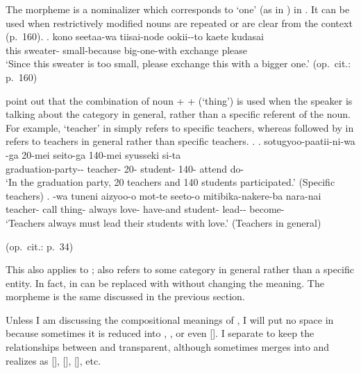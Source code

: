 The morpheme  is a nominalizer which corresponds to `one' (as in ) in .
It can be used when restrictively modified nouns are repeated or are clear from the context (p.\ 160).
%
\exg. kono seetaa-wa tiisai-node ookii--to kaete kudasai \\
	this sweater- small-because big-one-with exchange please \\
	`Since this sweater is too small, please exchange this with a bigger one.'
	\hfill{(op.\ cit.: p.\ 160)}

 point out that
the combination of noun +  +  (`thing') is used
when the speaker is talking about the category in general,
rather than a specific referent of the noun.
For example,  `teacher' in \Next[a] simply refers to specific teachers,
whereas  followed by  in \Next[b] refers to teachers in general rather than specific teachers.
%
\ex.
 \ag. sotugyoo-paatii-ni-wa -ga 20-mei seito-ga 140-mei syusseki si-ta \\
	graduation-party-- teacher- 20- student- 140- attend do- \\
	`In the graduation party, 20 teachers and 140 students participated.'
	\hfill{(Specific teachers)}
 \bg.   -wa tuneni aizyoo-o mot-te seeto-o mitibika-nakere-ba nara-nai \\
 teacher- call thing- always love- have-and student- lead-- become- \\
 `Teachers always must lead their students with love.'
 \hfill{(Teachers in general)}
 \begin{flushright}
 	(op.\ cit.: p.\ 34)
 \end{flushright}

This also applies to ;
 also refers to some category in general rather than a specific entity.
In fact,  in \Last[b] can be replaced with  without changing the meaning.
The morpheme  is the same  discussed in the previous section.

Unless I am discussing the compositional meanings of ,
I will put no space in 
because sometimes it is reduced into , , or even [].
I separate  to keep the relationships between  and  transparent,
although  sometimes merges into 
and realizes as [], [], [], etc.

